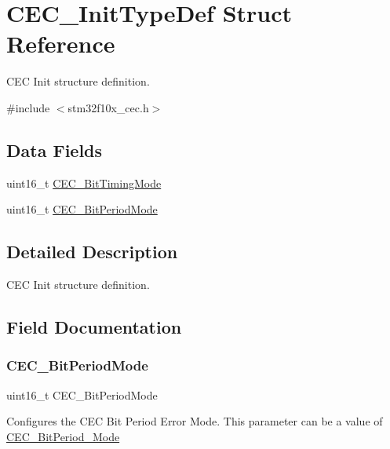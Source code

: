 \hypertarget{struct_c_e_c___init_type_def}{}\section{C\+E\+C\+\_\+\+Init\+Type\+Def Struct Reference}
\label{struct_c_e_c___init_type_def}


C\+EC Init structure definition.  




{\ttfamily \#include $<$stm32f10x\+\_\+cec.\+h$>$}

\subsection*{Data Fields}
\begin{DoxyCompactItemize}
\item 
uint16\+\_\+t \mbox{\hyperlink{struct_c_e_c___init_type_def_ad6f512e3b59ed805e97abd01e509cadf}{C\+E\+C\+\_\+\+Bit\+Timing\+Mode}}
\item 
uint16\+\_\+t \mbox{\hyperlink{struct_c_e_c___init_type_def_a864d8d41fdecc677f5306b5b88be9b01}{C\+E\+C\+\_\+\+Bit\+Period\+Mode}}
\end{DoxyCompactItemize}


\subsection{Detailed Description}
C\+EC Init structure definition. 



\subsection{Field Documentation}
\mbox{\label{struct_c_e_c___init_type_def_a864d8d41fdecc677f5306b5b88be9b01}} 
\subsubsection{\texorpdfstring{CEC\_BitPeriodMode}{CEC\_BitPeriodMode}}
{\footnotesize\ttfamily uint16\+\_\+t C\+E\+C\+\_\+\+Bit\+Period\+Mode}

Configures the C\+EC Bit Period Error Mode. This parameter can be a value of \mbox{\hyperlink{group___c_e_c___bit_period___mode}{C\+E\+C\+\_\+\+Bit\+Period\+\_\+\+Mode}} \mbox{\label{struct_c_e_c___init_type_def_ad6f512e3b59ed805e97abd01e509cadf}} 
